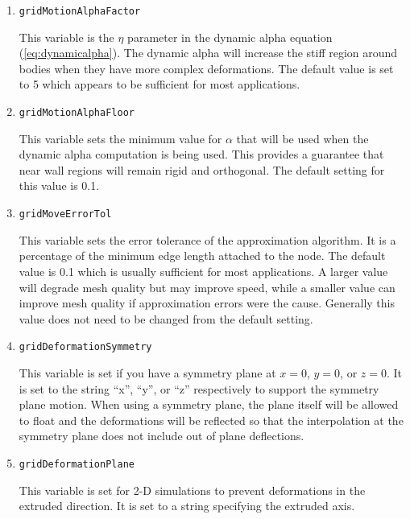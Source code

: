 \begin{enumerate}
  \item {\tt gridMotionAlphaFactor}

    This variable is the $\eta$ parameter in the dynamic alpha
    equation (\ref{eq:dynamicalpha}).  The dynamic alpha will increase
    the stiff region around bodies when they have more complex
    deformations.  The default value is set to 5 which appears to be
    sufficient for most applications.

  \item {\tt gridMotionAlphaFloor}

    This variable sets the minimum value for $\alpha$ that will be
    used when the dynamic alpha computation is being used.  This
    provides a guarantee that near wall regions will remain rigid and
    orthogonal.  The default setting for this value is 0.1.


  \item {\tt gridMoveErrorTol}

    This variable sets the error tolerance of the approximation
    algorithm.  It is a percentage of the minimum edge length attached
    to the node.  The default value is 0.1 which is usually sufficient
    for most applications.  A larger value will degrade mesh quality
    but may improve speed, while a smaller value can improve mesh
    quality if approximation errors were the cause.  Generally this
    value does not need to be changed from the default setting.

  \item {\tt gridDeformationSymmetry}

    This variable is set if you have a symmetry plane at $x=0$, $y=0$,
    or $z=0$.  It is set to the string ``x'', ``y'', or ``z''
    respectively to support the symmetry plane motion.  When using a
    symmetry plane, the plane itself will be allowed to float and the
    deformations will be reflected so that the interpolation at the
    symmetry plane does not include out of plane deflections.

  \item {\tt gridDeformationPlane}

    This variable is set for 2-D simulations to prevent deformations
    in the extruded direction.  It is set to a string specifying the
    extruded axis.

\end{enumerate}

